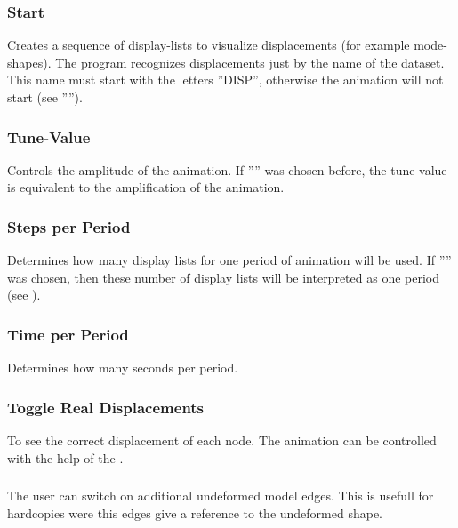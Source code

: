 \documentclass{article}
\begin{document}
\subsubsection{\label{Start}Start}
Creates a sequence of display-lists to visualize displacements (for example mode-shapes). The program recognizes displacements just by the name of the dataset. This name must start with the letters ''DISP'', otherwise the animation will not start (see '''').

\subsubsection{\label{Tune-Value}Tune-Value}
Controls the amplitude of the animation. If '''' was chosen before, the tune-value is equivalent to the amplification of the animation. 

\subsubsection{\label{Steps per Period}Steps per Period}
Determines how many display lists for one period of animation will be used. If '''' was chosen, then these number of display lists will be interpreted as one period (see ).

\subsubsection{\label{Time per Period}Time per Period}
Determines how many seconds per period. 

\subsubsection{\label{Toggle Real Displacements}Toggle Real Displacements}
To see the correct displacement of each node. The animation can be controlled with the help of the .

\subsubsection{\label{Toggle Static Model Edges}}
The user can switch on additional undeformed model edges. This is usefull for hardcopies were this edges give a reference to the undeformed shape.
\end{document}
